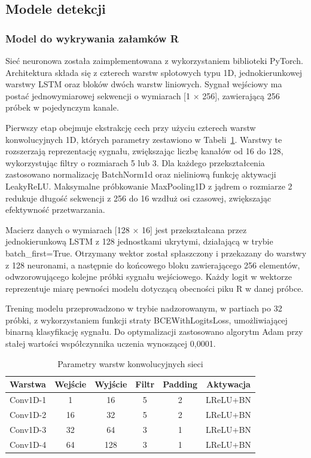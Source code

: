 \documentclass[journal]{IEEEtran}
\begin{document}
\newpage
\subsection{Modele detekcji}
\subsubsection{Model do wykrywania załamków R}
Sieć neuronowa została zaimplementowana z wykorzystaniem biblioteki PyTorch. Architektura składa się z czterech warstw splotowych typu 1D, jednokierunkowej warstwy LSTM oraz bloków dwóch warstw liniowych. Sygnał wejściowy ma postać jednowymiarowej sekwencji o wymiarach [1 × 256], zawierającą 256 próbek w pojedynczym kanale.

Pierwszy etap obejmuje ekstrakcję cech przy użyciu czterech warstw konwolucyjnych 1D, których parametry zestawiono w Tabeli~\ref{tab:conv_layers}. Warstwy te rozszerzają reprezentację sygnału, zwiększając liczbę kanałów od 16 do 128, wykorzystując filtry o rozmiarach 5 lub 3. Dla każdego przekształcenia zastosowano normalizację BatchNorm1d oraz nieliniową funkcję aktywacji LeakyReLU. Maksymalne próbkowanie MaxPooling1D z jądrem o rozmiarze 2 redukuje długość sekwencji z 256 do 16 wzdłuż osi czasowej, zwiększając efektywność przetwarzania.

Macierz danych o wymiarach [128 × 16] jest przekształcana przez jednokierunkową LSTM z 128 jednostkami ukrytymi, działającą w trybie batch\_first=True. Otrzymany wektor został spłaszczony i przekazany do warstwy z 128 neuronami, a następnie do końcowego bloku zawierającego 256 elementów, odwzorowującego kolejne próbki sygnału wejściowego. Każdy logit w wektorze reprezentuje miarę pewności modelu dotyczącą obecności piku R w danej próbce.

Trening modelu przeprowadzono w trybie nadzorowanym, w partiach po 32 próbki, z wykorzystaniem funkcji straty BCEWithLogitsLoss, umożliwiającej binarną klasyfikację sygnału. Do optymalizacji zastosowano algorytm Adam przy stałej wartości współczynnika uczenia wynoszącej 0,0001.

\begin{table}[h!]
\centering
\caption{Parametry warstw konwolucyjnych sieci}
\label{tab:conv_layers}
\begin{tabular}{|l|c|c|c|c|c|}
\hline
\textbf{Warstwa} & \textbf{Wejście} & \textbf{Wyjście} & \textbf{Filtr} & \textbf{Padding} & \textbf{Aktywacja} \\
\hline
Conv1D-1 & 1   & 16  & 5 & 2 & LReLU+BN \\
Conv1D-2 & 16  & 32  & 5 & 2 & LReLU+BN \\
Conv1D-3 & 32  & 64  & 3 & 1 & LReLU+BN \\
Conv1D-4 & 64  & 128 & 3 & 1 & LReLU+BN \\
\hline
\end{tabular}
\end{table}
\end{document}
